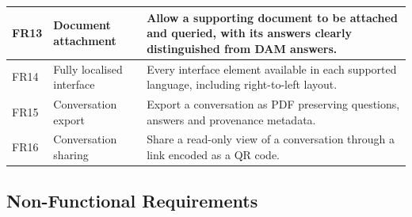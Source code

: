 \begin{longtable}{|p{}|p{}|p{}|}
FR13 & Document attachment & Allow a supporting document to be attached and queried, with its answers clearly distinguished from DAM answers. \\ \hline
FR14 & Fully localised interface & Every interface element available in each supported language, including right-to-left layout. \\ \hline
FR15 & Conversation export & Export a conversation as PDF preserving questions, answers and provenance metadata. \\ \hline
FR16 & Conversation sharing & Share a read-only view of a conversation through a link encoded as a QR code. \\ \hline
\end{longtable}

\subsection{Non-Functional Requirements}

